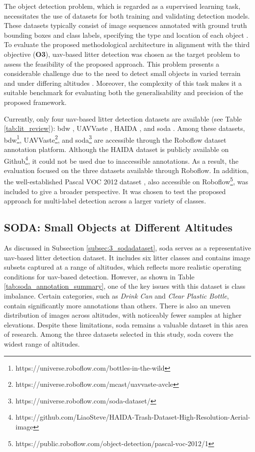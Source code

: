 The object detection problem, which is regarded as a supervised learning task, necessitates the use of datasets for both training and validating detection models. These datasets typically consist of image sequences annotated with ground truth bounding boxes and class labels, specifying the type and location of each object \cite{pascal-voc-2012, coco}.
To evaluate the proposed methodological architecture in alignment with the third objective (\textbf{O3}), \gls{uav}-based litter detection was chosen as the target problem to assess the feasibility of the proposed approach. This problem presents a considerable challenge due to the need to detect small objects in varied terrain and under differing altitudes \cite{soda_dataset}. Moreover, the complexity of this task makes it a suitable benchmark for evaluating both the generalisability and precision of the proposed framework.

Currently, only four \gls{uav}-based litter detection datasets are available (see Table \ref{tab:lit_review}): \gls{bdw} \cite{bdwdataset}, UAVVaste \cite{uavvaste}, HAIDA \cite{haida}, and \gls{soda} \cite{soda_dataset}. Among these datasets, \gls{bdw}\footnote{https://universe.roboflow.com/bottles-in-the-wild}, UAVVaste\footnote{https://universe.roboflow.com/mcast/uavvaste-avcle}, and \gls{soda}\footnote{https://universe.roboflow.com/soda-dataset/} are accessible through the Roboflow dataset annotation platform. Although the HAIDA dataset is publicly available on Github\footnote{https://github.com/LiaoSteve/HAIDA-Trash-Dataset-High-Resolution-Aerial-image}, it could not be used due to inaccessible annotations. As a result, the evaluation focused on the three datasets available through Roboflow. In addition, the well-established Pascal VOC 2012 dataset \cite{pascal-voc-2012}, also accessible on Roboflow\footnote{https://public.roboflow.com/object-detection/pascal-voc-2012/1}, was included to give a broader perspective. It was chosen to test the proposed approach for multi-label detection across a larger variety of classes.


\subsection{SODA: Small Objects at Different Altitudes}
\label{subsec:4_soda}

As discussed in Subsection \ref{subsec:3_sodadataset}, \gls{soda} serves as a representative \gls{uav}-based litter detection dataset. It includes six litter classes and contains image subsets captured at a range of altitudes, which reflects more realistic operating conditions for \gls{uav}-based detection.
However, as shown in Table \ref{tab:soda_annotation_summary}, one of the key issues with this dataset is class imbalance. Certain categories, such as \textit{Drink Can} and \textit{Clear Plastic Bottle}, contain significantly more annotations than others. There is also an uneven distribution of images across altitudes, with noticeably fewer samples at higher elevations.
Despite these limitations, \gls{soda} remains a valuable dataset in this area of research. Among the three datasets selected in this study, \gls{soda} covers the widest range of altitudes.

